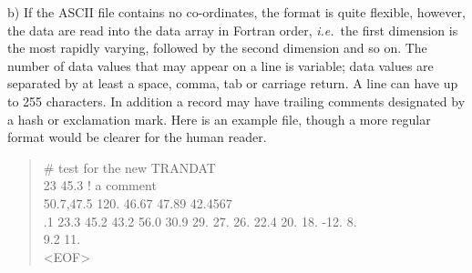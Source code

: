 {{{      b) If the ASCII file contains no co-ordinates, the format is
      quite flexible, however, the data are read into the data array
      in Fortran order, {\it i.e.}\ the first dimension is the most rapidly
      varying, followed by the second dimension and so on.  The number
      of data values that may appear on a line is variable; data values
      are separated by at least a space, comma, tab or carriage return.
      A line can have up to 255 characters.  In addition a record may
      have trailing comments designated by a hash or exclamation mark.
      Here is an example file, though a more regular format would be
      clearer for the human reader.
{\tt \begin{verse}
          \# test for the new TRANDAT \\
          23 45.3 ! a comment \\
          50.7,47.5 120. 46.67  47.89 42.4567 \\
          .1 23.3 45.2 43.2  56.0 30.9 29. 27. 26. 22.4 20. 18. -12. 8. \\
           9.2 11. \\
          <EOF>
\end{verse}}

}}}
